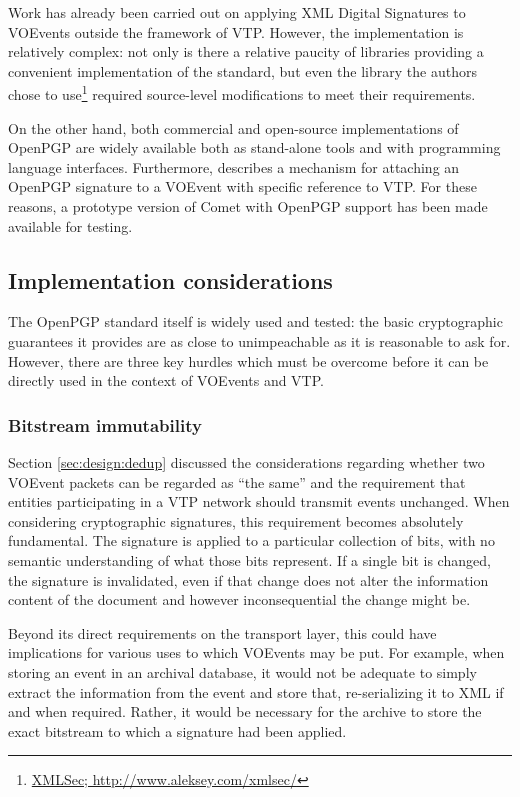 \documentclass[5p,authoryear]{elsarticle}
\begin{document}
Work has already been carried out on applying XML Digital Signatures to
VOEvents \citep{Allen:2008} outside the framework of VTP. However, the
implementation is relatively complex: not only is there a relative paucity of
libraries providing a convenient implementation of the standard, but even the
library the authors chose to use\footnote{\url{XMLSec;
http://www.aleksey.com/xmlsec/}} required source-level modifications to meet
their requirements.

On the other hand, both commercial and open-source implementations of OpenPGP
are widely available both as stand-alone tools and with programming language
interfaces. Furthermore, \citet{Denny:2008} describes a mechanism for attaching
an OpenPGP signature to a VOEvent with specific reference to VTP. For these
reasons, a prototype version of Comet with OpenPGP support has been made
available for testing.

\subsection{Implementation considerations}

The OpenPGP standard itself is widely used and tested: the basic cryptographic
guarantees it provides are as close to unimpeachable as it is reasonable to
ask for. However, there are three key hurdles which must be overcome before it
can be directly used in the context of VOEvents and VTP.

\subsubsection{Bitstream immutability}

Section \ref{sec:design:dedup} discussed the considerations regarding whether
two VOEvent packets can be regarded as ``the same'' and the requirement that
entities participating in a VTP network should transmit events unchanged. When
considering cryptographic signatures, this requirement becomes absolutely
fundamental. The signature is applied to a particular collection of bits, with
no semantic understanding of what those bits represent. If a single bit is
changed, the signature is invalidated, even if that change does not alter the
information content of the document and however inconsequential the change
might be.

Beyond its direct requirements on the transport layer, this could have
implications for various uses to which VOEvents may be put. For example, when
storing an event in an archival database, it would not be adequate to simply
extract the information from the event and store that, re-serializing it to
XML if and when required. Rather, it would be necessary for the archive to
store the exact bitstream to which a signature had been applied.
\end{document}
